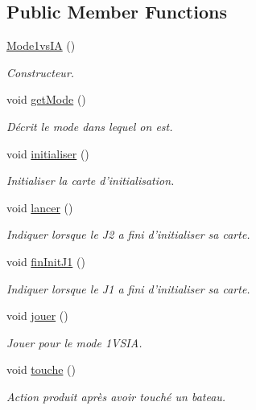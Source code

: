 \subsection*{Public Member Functions}
\begin{DoxyCompactItemize}
\item 
\hyperlink{classMode1vsIA_af8c73f16906279a89df6e9d150dfb1a2}{Mode1vs\+I\+A} ()
\begin{DoxyCompactList}\small\item\em Constructeur. \end{DoxyCompactList}\item 
void \hyperlink{classMode1vsIA_a8853a5c4bd43685f2232929f9d9d8732}{get\+Mode} ()
\begin{DoxyCompactList}\small\item\em Décrit le mode dans lequel on est. \end{DoxyCompactList}\item 
void \hyperlink{classMode1vsIA_a2e92031d0b7626da4f87ecc856a4ae94}{initialiser} ()
\begin{DoxyCompactList}\small\item\em Initialiser la carte d'initialisation. \end{DoxyCompactList}\item 
void \hyperlink{classMode1vsIA_ab6aa884defaf26231ede82d689b80d60}{lancer} ()
\begin{DoxyCompactList}\small\item\em Indiquer lorsque le J2 a fini d'initialiser sa carte. \end{DoxyCompactList}\item 
void \hyperlink{classMode1vsIA_ab50fb645a214d5cfab5fdb7a2b98673c}{fin\+Init\+J1} ()
\begin{DoxyCompactList}\small\item\em Indiquer lorsque le J1 a fini d'initialiser sa carte. \end{DoxyCompactList}\item 
void \hyperlink{classMode1vsIA_a7f7ab3fae5995ab12d6ce508c3d7dbca}{jouer} ()
\begin{DoxyCompactList}\small\item\em Jouer pour le mode 1\+V\+S\+I\+A. \end{DoxyCompactList}\item 
void \hyperlink{classMode1vsIA_a1da5810e6d744e2cbeae3ceebe6df521}{touche} ()
\begin{DoxyCompactList}\small\item\em Action produit après avoir touché un bateau. \end{DoxyCompactList}\item 

\end{DoxyCompactItemize}
